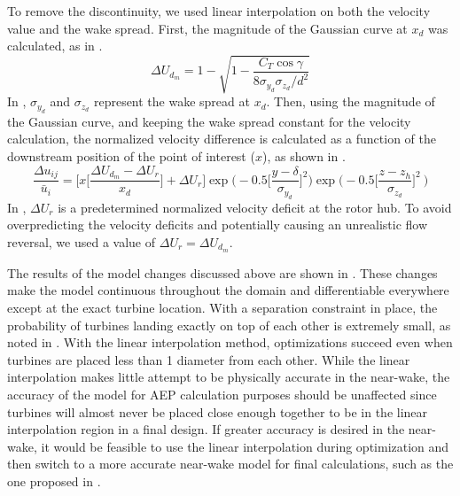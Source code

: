 \documentclass[conf]{new-aiaa}
\begin{document}
To remove the discontinuity, we used linear interpolation on both the velocity value and the wake spread. First, the magnitude of the Gaussian curve at $x_d$ was calculated, as in .
%
\begin{equation}\label{eq:gauss-mag}
	\Delta U_{d_m} = 1 - \sqrt{1 - \frac{C_T \cos{\gamma}}{8 \sigma_{y_d}  \sigma_{z_d}/d^2}}
\end{equation}
%
In , $\sigma_{y_d}$ and $\sigma_{z_d}$ represent the wake spread at $x_d$. Then, using the magnitude of the Gaussian curve, and keeping the wake spread constant for the velocity calculation, the normalized velocity difference is calculated as a function of the downstream position of the point of interest ($x$), as shown in .
\begin{equation}\label{eq:bplinear}
	\frac{\Delta u_{ij}}{\bar{u}_{i}} = \bigg[x\bigg[\frac{\Delta U_{d_m} - \Delta U_r}{x_d}\bigg] + \Delta U_r\bigg]
        \exp{\bigg(-0.5\bigg[\frac{y-\delta}{ \sigma_{y_d}}\bigg]^2\bigg)}\exp{\bigg(-0.5\bigg[\frac{z-z_h}{ \sigma_{z_d}}\bigg]^2~\bigg)}
\end{equation}
%
In , $\Delta U_r$ is a predetermined normalized velocity deficit at the rotor hub. To avoid overpredicting the velocity deficits and potentially causing an unrealistic flow reversal,  we used a value of $\Delta U_r=\Delta U_{d_m}$. 

The results of the model changes discussed above are shown in . These changes make the model continuous throughout the domain and differentiable everywhere except at the exact turbine location. With a separation constraint in place, the probability of turbines landing exactly on top of each other is extremely small, as noted in \cite{thomas2017}. With the linear interpolation method, optimizations succeed even when turbines are placed less than 1 diameter from each other. While the linear interpolation makes little attempt to be physically accurate in the near-wake, the accuracy of the model for AEP calculation purposes should be unaffected since turbines will almost never be placed close enough together to be in the linear interpolation region in a final design. If greater accuracy is desired in the near-wake, it would be feasible to use the linear interpolation during optimization and then switch to a more accurate near-wake model for final calculations, such as the one proposed in \cite{keane2016}.
\end{document}
